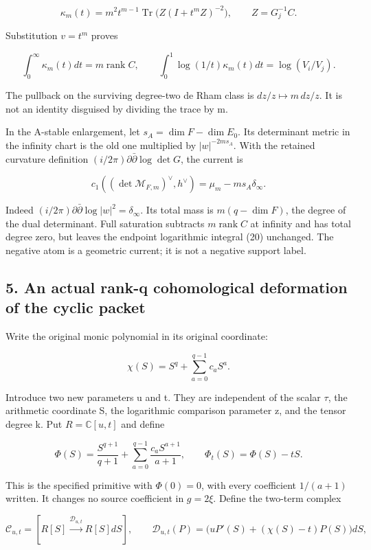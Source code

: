 \documentclass[
  11pt,
]{article}
\begin{document}
\[
\kappa_m(t)=m^2t^{m-1}\operatorname{Tr}\bigl(Z(I+t^mZ)^{-2}\bigr),
\qquad Z=G_j^{-1}C.
\tag{19}
\]

Substitution \(v=t^m\) proves

\[
\boxed{\int_0^\infty\kappa_m(t)dt=m\operatorname{rank}C,\qquad
\int_0^1\log(1/t)\kappa_m(t)dt=\log(V_i/V_j).}
\tag{20}
\]

The pullback on the surviving degree-two de Rham class is
\(dz/z\mapsto m\,dz/z\). It is not an identity disguised by dividing the
trace by m.

In the A-stable enlargement, let \(s_A=\dim F-\dim E_0\). Its
determinant metric in the infinity chart is the old one multiplied by
\(|w|^{-2ms_A}\). With the retained curvature definition
\((i/2\pi)\partial\bar\partial\log\det G\), the current is

\[
\boxed{c_1((\det\mathcal M_{F,m})^\vee,h^\vee)
=\mu_m-ms_A\delta_\infty.}
\tag{21}
\]

Indeed \((i/2\pi)\partial\bar\partial\log|w|^2=\delta_\infty\). Its
total mass is \(m(q-\dim F)\), the degree of the dual determinant. Full
saturation subtracts \(m\operatorname{rank}C\) at infinity and has total
degree zero, but leaves the endpoint logarithmic integral (20)
unchanged. The negative atom is a geometric current; it is not a
negative support label.

\subsection{5. An actual rank-q cohomological deformation of the cyclic
packet}\label{an-actual-rank-q-cohomological-deformation-of-the-cyclic-packet}

Write the original monic polynomial in its original coordinate:

\[
\chi(S)=S^q+\sum_{a=0}^{q-1}c_aS^a.
\tag{22}
\]

Introduce two new parameters u and t. They are independent of the scalar
\(\tau\), the arithmetic coordinate S, the logarithmic comparison
parameter z, and the tensor degree k. Put \(R=\mathbb C[u,t]\) and
define

\[
\Phi(S)=\frac{S^{q+1}}{q+1}+\sum_{a=0}^{q-1}\frac{c_aS^{a+1}}{a+1},
\qquad\Phi_t(S)=\Phi(S)-tS.
\tag{23}
\]

This is the specified primitive with \(\Phi(0)=0\), with every
coefficient \(1/(a+1)\) written. It changes no source coefficient in
\(g=2\xi\). Define the two-term complex

\[
\mathcal C_{u,t}=[R[S]\xrightarrow{\mathcal D_{u,t}}R[S]dS],
\qquad
\mathcal D_{u,t}(P)=\bigl(uP'(S)+(\chi(S)-t)P(S)\bigr)dS,
\tag{24}
\]
\end{document}
